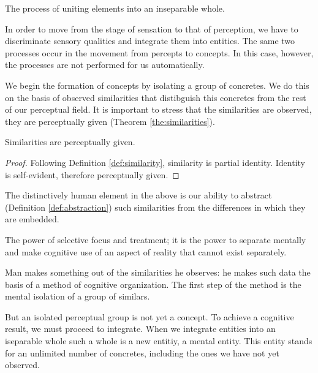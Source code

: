             \begin{definition}[Integration]
            \label{def:integration}
                The process of uniting elements into an inseparable whole.
            \end{definition}

        In order to move from the stage of sensation to that of perception, we have to discriminate sensory qualities and integrate them into entities. The same two processes occur in the movement from percepts to concepts. In this case, however, the processes are not performed for us automatically.

        We begin the formation of concepts by isolating a group of concretes. We do this on the basis of observed similarities that distibguish this concretes from the rest of our perceptual field. It is important to stress that the similarities are observed, they are perceptually given (Theorem \ref{the:similarities}).

        \begin{theorem}
        \label{the:similarities}
            Similarities are perceptually given.
        \end{theorem}

        \begin{proof}
            Following Definition \ref{def:similarity}, similarity is partial identity. Identity is self-evident, therefore perceptually given.
        \end{proof}

        The distinctively human element in the above is our ability to abstract (Definition \ref{def:abstraction}) such similarities from the differences in which they are embedded.

            \begin{definition}[Abstraction]
            \label{def:abstraction}
                The power of selective focus and treatment; it is the power to separate mentally and make cognitive use of an aspect of reality that cannot exist separately.
            \end{definition}

        Man makes something out of the similarities he observes: he makes such data the basis of a method of cognitive organization. The first step of the method is the mental isolation of a group of similars.

        But an isolated perceptual group is not yet a concept. To achieve a cognitive result, we must proceed to integrate. When we integrate entities into an iseparable whole such a whole is a new entitiy, a mental entity. This entity stands for an unlimited number of concretes, including the ones we have not yet observed.

